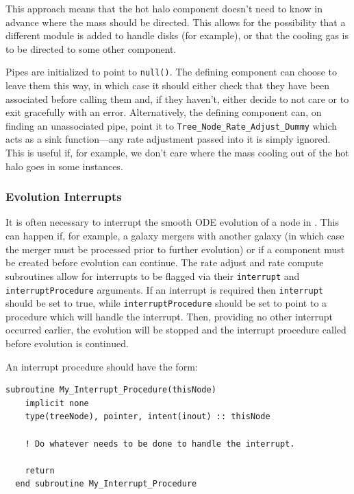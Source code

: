 This approach means that the hot halo component doesn't need to know in advance where the mass should be directed. This allows for the possibility that a different module is added to handle disks (for example), or that the cooling gas is to be directed to some other component.

Pipes are initialized to point to {\tt null()}. The defining component can choose to leave them this way, in which case it should either check that they have been associated before calling them and, if they haven't, either decide to not care or to exit gracefully with an error. Alternatively, the defining component can, on finding an unassociated pipe, point it to {\tt Tree\_Node\_Rate\_Adjust\_Dummy} which acts as a sink function---any rate adjustment passed into it is simply ignored. This is useful if, for example, we don't care where the mass cooling out of the hot halo goes in some instances.

\subsubsection{Evolution Interrupts}

It is often necessary to interrupt the smooth ODE evolution of a node in \glc. This can happen if, for example, a galaxy mergers with another galaxy (in which case the merger must be processed prior to further evolution) or if a component must be created before evolution can continue. The rate adjust and rate compute subroutines allow for interrupts to be flagged via their {\tt interrupt} and {\tt interruptProcedure} arguments. If an interrupt is required then {\tt interrupt} should be set to true, while {\tt interruptProcedure} should be set to point to a procedure which will handle the interrupt. Then, providing no other interrupt occurred earlier, the evolution will be stopped and the interrupt procedure called before evolution is continued.

An interrupt procedure should have the form:
\begin{lstlisting}[escapechar=@,breaklines,prebreak=\&,postbreak=\&]
  subroutine My_Interrupt_Procedure(thisNode)
    implicit none
    type(treeNode), pointer, intent(inout) :: thisNode
  
    ! Do whatever needs to be done to handle the interrupt.

    return
  end subroutine My_Interrupt_Procedure
\end{lstlisting}

